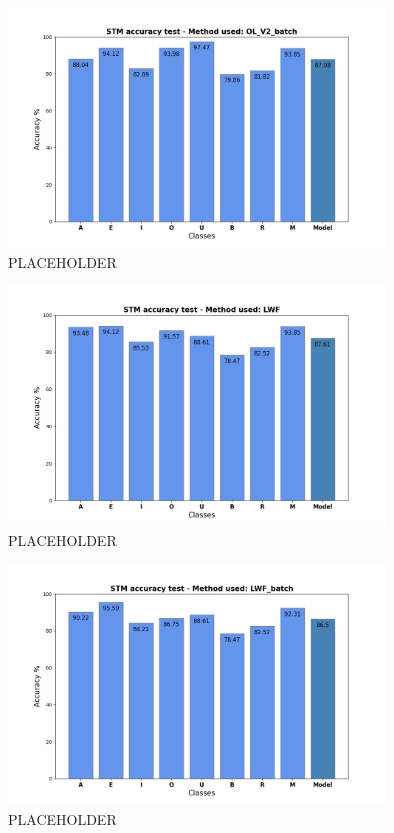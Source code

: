 \documentclass[12pt]{report}
\begin{document}
%
%
\begin{figure}[h!]
    \centering
    \includegraphics[width=100mm]{Figures/Chapter5/STM_barPlot_OL_V2_batch.jpg} 
    \caption{PLACEHOLDER}
    \label{fig:letter_res_OL_v2_batch}    
\end{figure}
%
%
\begin{figure}[h!]
    \centering
    \includegraphics[width=100mm]{Figures/Chapter5/STM_barPlot_LWF.jpg} 
    \caption{PLACEHOLDER}
    \label{fig:letter_res_LWF}    
\end{figure}
%
%
\begin{figure}[h!]
    \centering
    \includegraphics[width=100mm]{Figures/Chapter5/STM_barPlot_LWF_batch.jpg} 
    \caption{PLACEHOLDER}
    \label{fig:letter_res_LWF_batch}    
\end{figure}
\end{document}
